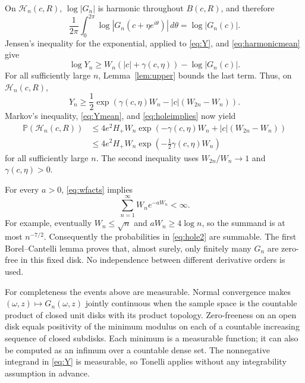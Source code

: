 \documentclass[11pt]{article}
\theoremstyle{remark}
\newcommand{\Prob}{\mathbb P}
\newcommand{\dd}{\,d}
\newcommand{\avint}{\frac{1}{2\pi}\int_0^{2\pi}}
\begin{document}
On $\mathcal H_n(c,R)$, $\log|G_n|$ is harmonic throughout
$B(c,R)$, and therefore
\begin{equation}\label{eq:harmonicmean}
 \avint\log|G_n(c+\eta e^{i\theta})|\dd\theta
 =\log|G_n(c)|.
\end{equation}
Jensen's inequality for the exponential, applied to \eqref{eq:Y},
and \eqref{eq:harmonicmean} give
\[
 \log Y_n\geq W_n(|c|+\gamma(c,\eta))-\log|G_n(c)|.
\]
For all sufficiently large $n$, Lemma~\ref{lem:upper} bounds the
last term. Thus, on $\mathcal H_n(c,R)$,
\begin{equation}\label{eq:holeimplies}
 Y_n\geq\frac12
 \exp\!\left(\gamma(c,\eta)W_n-|c|(W_{2n}-W_n)\right).
\end{equation}
Markov's inequality, \eqref{eq:Ymean}, and
\eqref{eq:holeimplies} now yield
\begin{align}
 \Prob(\mathcal H_n(c,R))
 &\leq4e^2H_+W_n
  \exp\!\left(-\gamma(c,\eta)W_n+|c|(W_{2n}-W_n)\right)
   \label{eq:hole1}\\
 &\leq4e^2H_+W_n\exp\!\left(-\tfrac12\gamma(c,\eta)W_n\right)
   \label{eq:hole2}
\end{align}
for all sufficiently large $n$. The second inequality uses
$W_{2n}/W_n\to1$ and $\gamma(c,\eta)>0$.

For every $a>0$, \eqref{eq:wfacts} implies
\begin{equation}\label{eq:summable}
 \sum_{n=1}^\infty W_n e^{-aW_n}<\infty.
\end{equation}
For example, eventually $W_n\leq\sqrt n$ and
$aW_n\geq4\log n$, so the summand is at most $n^{-7/2}$.
Consequently the probabilities in \eqref{eq:hole2} are summable.
The first Borel--Cantelli lemma proves that, almost surely,
only finitely many $G_n$ are zero-free in this fixed disk.
No independence between different derivative orders is used.

For completeness the events above are measurable. Normal convergence
makes $(\omega,z)\mapsto G_n(\omega,z)$ jointly continuous when the
sample space is the countable product of closed unit disks with its
product topology. Zero-freeness on an open disk equals positivity of
the minimum modulus on each of a countable increasing sequence of
closed subdisks. Each minimum is a measurable function; it can also
be computed as an infimum over a countable dense set. The nonnegative
integrand in \eqref{eq:Y} is measurable, so Tonelli applies without
any integrability assumption in advance.
\end{document}
